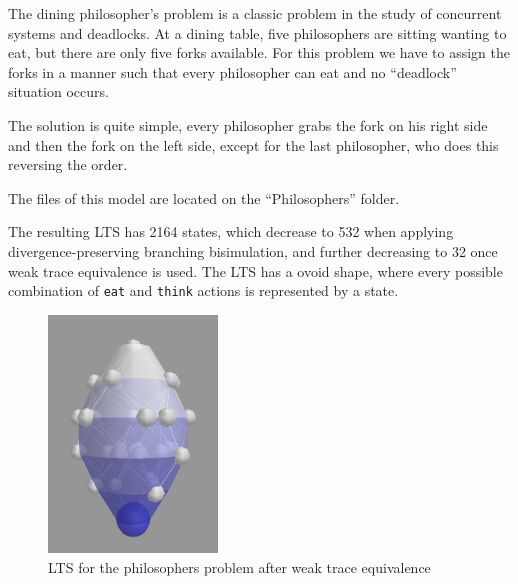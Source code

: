 \documentclass[11pt]{article}
\theoremstyle{definition}
\theoremstyle{plain}
\theoremstyle{definition}
\begin{document}
\begin{appendices}
The dining philosopher's problem is a classic problem in the study of concurrent systems and deadlocks. At a dining table, five philosophers are sitting wanting to eat, but there are only five forks available. For this problem we have to assign the forks in a manner such that every philosopher can eat and no ``deadlock'' situation occurs.

The solution is quite simple, every philosopher grabs the fork on his right side and then the fork on the left side, except for the last philosopher, who does this reversing the order.

The files of this model are located on the ``Philosophers'' folder.

The resulting LTS has 2164 states, which decrease to 532 when applying divergence-preserving branching bisimulation, and further decreasing to 32 once weak trace equivalence is used. The LTS has a ovoid shape, where every possible combination of \texttt{eat} and \texttt{think} actions is represented by a state.

\begin{figure}
\centering
\includegraphics[width=0.4\textwidth, keepaspectratio]{img/Philosophers/wt.png}
\caption{LTS for the philosophers problem after weak trace equivalence}\label{phiwt}
\end{figure}

\end{appendices}


\newpage

{}
\end{document}
